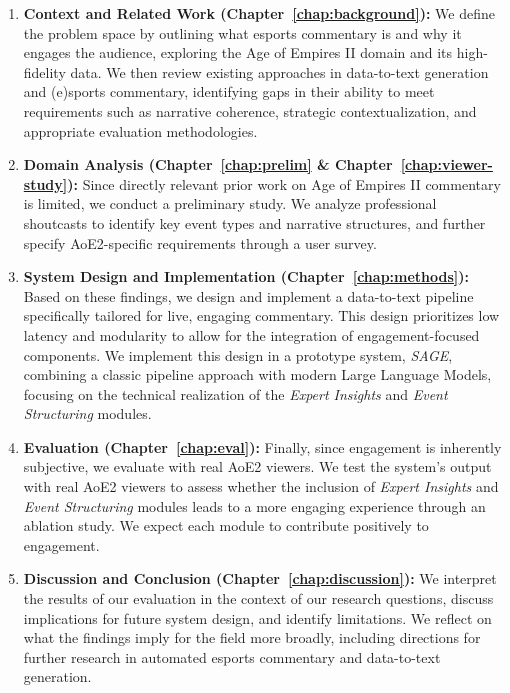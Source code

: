\begin{enumerate}
  \item \textbf{Context and Related Work (Chapter~\ref{chap:background}):} We define the problem space by outlining what esports commentary is and why it engages the audience, exploring the Age of Empires II domain and its high-fidelity data. We then review existing approaches in data-to-text generation and (e)sports commentary, identifying gaps in their ability to meet requirements such as narrative coherence, strategic contextualization, and appropriate evaluation methodologies.
  \item \textbf{Domain Analysis (Chapter~\ref{chap:prelim} \& Chapter~\ref{chap:viewer-study}):} Since directly relevant prior work on Age of Empires II commentary is limited, we conduct a preliminary study. We analyze professional shoutcasts to identify key event types and narrative structures, and further specify AoE2-specific requirements through a user survey.
  \item \textbf{System Design and Implementation (Chapter~\ref{chap:methods}):} Based on these findings, we design and implement a data-to-text pipeline specifically tailored for live, engaging commentary. This design prioritizes low latency and modularity to allow for the integration of engagement-focused components. We implement this design in a prototype system, \textit{SAGE}, combining a classic pipeline approach with modern Large Language Models, focusing on the technical realization of the \textit{Expert Insights} and \textit{Event Structuring} modules.
  \item \textbf{Evaluation (Chapter~\ref{chap:eval}):} Finally, since engagement is inherently subjective, we evaluate with real AoE2 viewers. We test the system's output with real AoE2 viewers to assess whether the inclusion of \textit{Expert Insights} and \textit{Event Structuring} modules leads to a more engaging experience through an ablation study. We expect each module to contribute positively to engagement.
  \item \textbf{Discussion and Conclusion (Chapter~\ref{chap:discussion}):} We interpret the results of our evaluation in the context of our research questions, discuss implications for future system design, and identify limitations. We reflect on what the findings imply for the field more broadly, including directions for further research in automated esports commentary and data-to-text generation.
\end{enumerate}